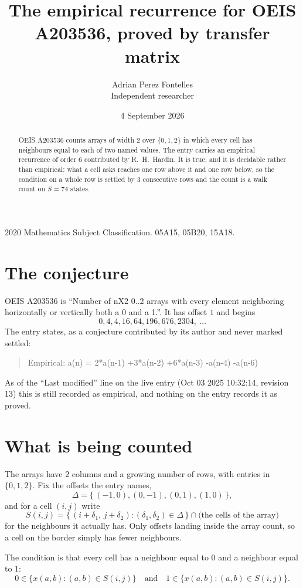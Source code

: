 \documentclass[11pt,a4paper]{article}
\title{The empirical recurrence for OEIS A203536, proved by transfer matrix}
\author{Adrian Perez Fontelles\\ \small Independent researcher}
\date{4 September 2026}
\theoremstyle{plain}
\theoremstyle{definition}
\begin{document}
\maketitle

\begin{abstract}
OEIS A203536 counts arrays of width $2$ over $\{0,1,2\}$ in which every cell has neighbours equal to each of two named values. The entry carries an
empirical recurrence of order $6$ contributed by R.~H.~Hardin. It is true, and it is
decidable rather than empirical: what a cell asks reaches one row above it and one row below, so the
condition on a whole row is settled by $3$ consecutive rows and the count is a walk
count on $S=74$ states.
\end{abstract}

\noindent\small 2020 Mathematics Subject Classification. 05A15, 05B20, 15A18.\normalsize

\section{The conjecture}

OEIS A203536 is ``Number of nX2 0..2 arrays with every element neighboring horizontally or vertically both a 0 and a 1.''. It has offset $1$ and begins
\[
0, 4, 4, 16, 64, 196, 676, 2304,\ \dots
\]
The entry states, as a conjecture contributed by its author and never marked settled:
\begin{quote}
Empirical: a(n) = 2*a(n-1) +3*a(n-2) +6*a(n-3) -a(n-4) -a(n-6)
\end{quote}
As of the ``Last modified'' line on the live entry (Oct 03 2025 10:32:14, revision 13) this is still
recorded as empirical, and nothing on the entry records it as proved.

\section{What is being counted}

The arrays have $2$ columns and a growing number of rows, with entries in $\{0,1,2\}$. Fix the
offsets the entry names,
\[
\Delta=\{\,(-1,0), (0,-1), (0,1), (1,0)\,\},
\]
and for a cell $(i,j)$ write
\[
S(i,j)=\{\,(i+\delta_1,\,j+\delta_2) : (\delta_1,\delta_2)\in\Delta\,\}\cap
\text{(the cells of the array)}
\]
for the neighbours it actually has. Only offsets landing inside the array count, so a cell on
the border simply has fewer neighbours.

The condition is that every cell has a neighbour equal to $0$ and a neighbour equal to $1$:
\[
0\in\{x(a,b):(a,b)\in S(i,j)\}\quad\text{and}\quad1\in\{x(a,b):(a,b)\in S(i,j)\}.
\]
\end{document}
